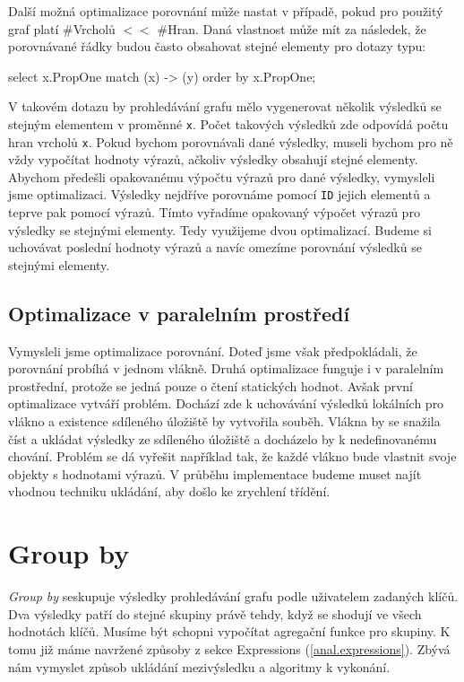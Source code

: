 Další možná optimalizace porovnání může nastat v případě, pokud pro použitý graf platí \#Vrcholů $<<$ \#Hran.
Daná vlastnost může mít za následek, že porovnávané řádky budou často obsahovat stejné elementy pro dotazy typu:
\begin{code}
select x.PropOne match (x) -> (y) order by x.PropOne;
\end{code}
V takovém dotazu by prohledávání grafu mělo vygenerovat několik výsledků se stejným elementem v proměnné \texttt{x}.
Počet takových výsledků zde odpovídá počtu hran vrcholů \texttt{x}.
Pokud bychom porovnávali dané výsledky, museli bychom pro ně vždy vypočítat hodnoty výrazů, ačkoliv výsledky obsahují stejné elementy.
Abychom předešli opakovanému výpočtu výrazů pro dané výsledky, vymysleli jsme optimalizaci.
Výsledky nejdříve porovnáme pomocí \texttt{ID} jejich elementů a teprve pak pomocí výrazů.
Tímto vyřadíme opakovaný výpočet výrazů pro výsledky se stejnými elementy.
Tedy využijeme dvou optimalizací.
Budeme si uchovávat poslední hodnoty výrazů a navíc omezíme porovnání výsledků se stejnými elementy.

\subsection{Optimalizace v paralelním prostředí}

Vymysleli jsme optimalizace porovnání.
Doteď jsme však předpokládali, že porovnání probíhá v jednom vlákně.
Druhá optimalizace funguje i v paralelním prostřední, protože se jedná pouze o čtení statických hodnot.
Avšak první optimalizace vytváří problém.
Dochází zde k uchovávání výsledků lokálních pro vlákno a existence sdíleného úložiště by vytvořila souběh.
Vlákna by se snažila číst a ukládat výsledky ze sdíleného úložiště a docházelo by k nedefinovanému chování.
Problém se dá vyřešit například tak, že každé vlákno bude vlastnit svoje objekty s hodnotami výrazů.
V průběhu implementace budeme muset najít vhodnou techniku ukládání, aby došlo ke zrychlení třídění.

\section{Group by} \label{anal.groupby}

\textit{Group by} seskupuje výsledky prohledávání grafu podle uživatelem zadaných klíčů.
Dva výsledky patří do stejné skupiny právě tehdy, když se shodují ve všech hodnotách klíčů.
Musíme být schopni vypočítat agregační funkce pro skupiny.
K tomu již máme navržené způsoby z sekce Expressions (\ref{anal.expressions}).
Zbývá nám vymyslet způsob ukládání mezivýsledku a algoritmy k vykonání.

